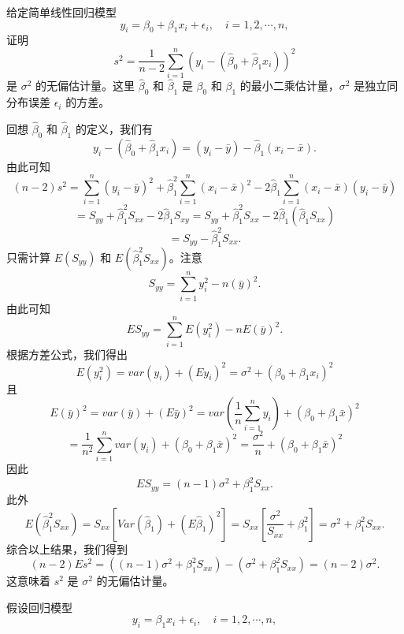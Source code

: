 \begin{questions}
    \question
给定简单线性回归模型
\[
y_i = \beta_0 + \beta_1 x_i + \epsilon_i, \quad i = 1, 2, \cdots, n,
\]
证明
\[
s^2 = \frac{1}{n - 2} \sum_{i=1}^n \left(y_i - \left(\hat{\beta}_0 + \hat{\beta}_1 x_i\right)\right)^2
\]
是 $\sigma^2$ 的无偏估计量。这里 $\hat{\beta}_0$ 和 $\hat{\beta}_1$ 是 $\beta_0$ 和 $\beta_1$ 的最小二乘估计量，$\sigma^2$ 是独立同分布误差 $\epsilon_i$ 的方差。

\begin{solution}
回想 $\hat{\beta}_0$ 和 $\hat{\beta}_1$ 的定义，我们有
\[
y_i - \left(\hat{\beta}_0 + \hat{\beta}_1 x_i\right) = \left(y_i - \bar{y}\right) - \hat{\beta}_1 \left(x_i - \bar{x}\right).
\]
由此可知
\[
(n - 2) s^2 = \sum_{i=1}^n \left(y_i - \bar{y}\right)^2 + \hat{\beta}_1^2 \sum_{i=1}^n \left(x_i - \bar{x}\right)^2 - 2 \hat{\beta}_1 \sum_{i=1}^n \left(x_i - \bar{x}\right) \left(y_i - \bar{y}\right)
\]
\[
= S_{yy} + \hat{\beta}_1^2 S_{xx} - 2 \hat{\beta}_1 S_{xy} = S_{yy} + \hat{\beta}_1^2 S_{xx} - 2 \hat{\beta}_1 \left(\hat{\beta}_1 S_{xx}\right)
\]
\[
= S_{yy} - \hat{\beta}_1^2 S_{xx}.
\]
只需计算 $E(S_{yy})$ 和 $E(\hat{\beta}_1^2 S_{xx})$。注意
\[
S_{yy} = \sum_{i=1}^n y_i^2 - n \left(\bar{y}\right)^2.
\]
由此可知
\[
E S_{yy} = \sum_{i=1}^n E \left(y_i^2\right) - n E \left(\bar{y}\right)^2.
\]
根据方差公式，我们得出
\[
E \left(y_i^2\right) = var(y_i) + \left(E y_i\right)^2 = \sigma^2 + \left(\beta_0 + \beta_1 x_i\right)^2
\]
且
\[
E \left(\bar{y}\right)^2 = var(\bar{y}) + \left(E \bar{y}\right)^2 = var\left(\frac{1}{n} \sum_{i=1}^n y_i\right) + \left(\beta_0 + \beta_1 \bar{x}\right)^2
\]
\[
= \frac{1}{n^2} \sum_{i=1}^n var(y_i) + \left(\beta_0 + \beta_1 \bar{x}\right)^2 = \frac{\sigma^2}{n} + \left(\beta_0 + \beta_1 \bar{x}\right)^2
\]
因此
\[
E S_{yy} = (n - 1) \sigma^2 + \beta_1^2 S_{xx}.
\]
此外
\[
E \left(\hat{\beta}_1^2 S_{xx}\right) = S_{xx} \left[Var\left(\hat{\beta}_1\right) + \left(E \hat{\beta}_1\right)^2\right] = S_{xx} \left[\frac{\sigma^2}{S_{xx}} + \beta_1^2\right] = \sigma^2 + \beta_1^2 S_{xx}.
\]
综合以上结果，我们得到
\[
(n - 2) E s^2 = \left((n - 1) \sigma^2 + \beta_1^2 S_{xx}\right) - \left(\sigma^2 + \beta_1^2 S_{xx}\right) = (n - 2) \sigma^2.
\]
这意味着 $s^2$ 是 $\sigma^2$ 的无偏估计量。
\end{solution}

\question
假设回归模型
\[
y_i = \beta_1 x_i + \epsilon_i, \quad i = 1, 2, \cdots, n,
\]
\end{questions}
